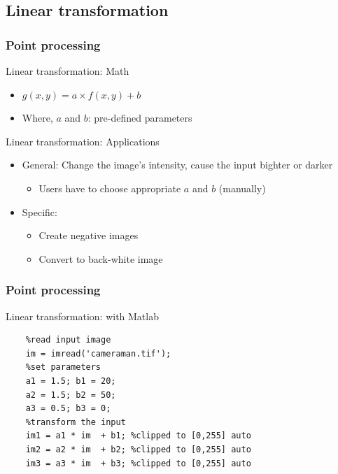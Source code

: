 \documentclass[english,11pt,table,handout]{beamer}
\begin{document}
\subsection{Linear transformation}
\begin{frame}[fragile]
	\frametitle{Point processing}
	\begin{block}{Linear transformation: Math}
		\begin{itemize}
			\item  $g(x,y) = a \times f(x,y) + b$
			\item Where, $a$ and $b$: pre-defined parameters
		\end{itemize}
	\end{block}

	\begin{block}{Linear transformation: Applications}
		\begin{itemize}
			\item General: Change the image's intensity, cause the input bighter or darker
			\begin{itemize}
				\item Users have to choose appropriate $a$ and $b$ (manually)
			\end{itemize}
			\item Specific:
			\begin{itemize}
				\item Create negative images
				\item Convert to back-white image
			\end{itemize}
		\end{itemize}
	\end{block}
\end{frame}

\begin{frame}[fragile]
\frametitle{Point processing}
\begin{block}{Linear transformation: with Matlab}
	\begin{lstlisting}
	%read input image
	im = imread('cameraman.tif');
	%set parameters
	a1 = 1.5; b1 = 20;
	a2 = 1.5; b2 = 50;
	a3 = 0.5; b3 = 0;
	%transform the input
	im1 = a1 * im  + b1; %clipped to [0,255] auto
	im2 = a2 * im  + b2; %clipped to [0,255] auto
	im3 = a3 * im  + b3; %clipped to [0,255] auto
	
	
	\end{lstlisting}
\end{block}
\end{frame}
\end{document}
